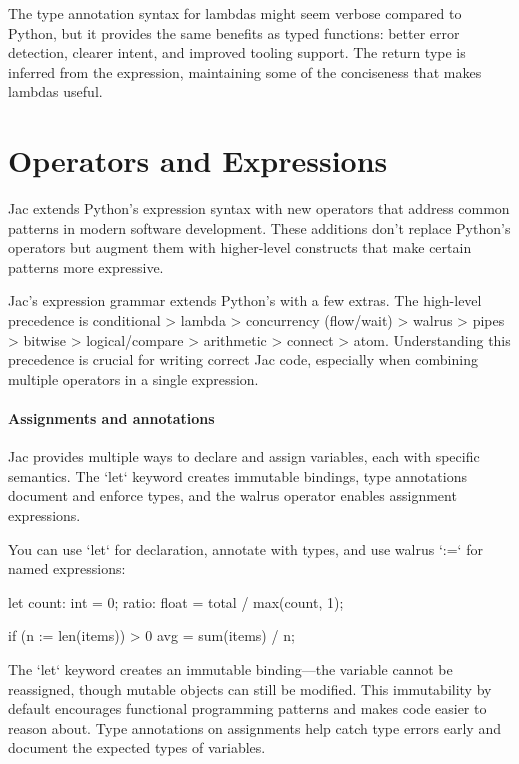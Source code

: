 The type annotation syntax for lambdas might seem verbose compared to Python, but it provides the same benefits as typed functions: better error detection, clearer intent, and improved tooling support. The return type is inferred from the expression, maintaining some of the conciseness that makes lambdas useful.

\section{Operators and Expressions}

Jac extends Python's expression syntax with new operators that address common patterns in modern software development. These additions don't replace Python's operators but augment them with higher-level constructs that make certain patterns more expressive.

Jac's expression grammar extends Python's with a few extras. The high-level precedence is conditional > lambda > concurrency (flow/wait) > walrus > pipes > bitwise > logical/compare > arithmetic > connect > atom. Understanding this precedence is crucial for writing correct Jac code, especially when combining multiple operators in a single expression.

\paragraph{Assignments and annotations}

Jac provides multiple ways to declare and assign variables, each with specific semantics. The `let` keyword creates immutable bindings, type annotations document and enforce types, and the walrus operator enables assignment expressions.

You can use `let` for declaration, annotate with types, and use walrus `:=` for named expressions:

\begin{jacblock}
let count: int = 0;
ratio: float = total / max(count, 1);

if (n := len(items)) > 0 {
    avg = sum(items) / n;
}
\end{jacblock}

The `let` keyword creates an immutable binding—the variable cannot be reassigned, though mutable objects can still be modified. This immutability by default encourages functional programming patterns and makes code easier to reason about. Type annotations on assignments help catch type errors early and document the expected types of variables.

